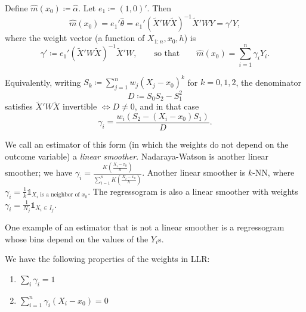 Define $\hat{m}(x_0)\coloneqq\hat{\alpha}$. Let $e_1 \coloneqq (1,0)'$. Then
\[
\hat{m}(x_0)
= e_1'\hat{\theta}
= e_1'(\tilde{X}'W\tilde{X})^{-1}\tilde{X}'WY
= \gamma' Y,
\]
where the weight vector (a function of $X_{1:n},x_0,h$) is
\[
\gamma'
\coloneqq e_1'(\tilde{X}'W\tilde{X})^{-1}\tilde{X}'W,
\qquad\text{so that}\qquad
\hat{m}(x_0)=\sum\limits_{i=1}^{n}\gamma_i Y_i.
\]

Equivalently, writing $S_k \coloneqq \sum\limits_{j=1}^{n} w_j (X_j-x_0)^k$ for $k=0,1,2$,
the denominator
\[
D \coloneqq S_0S_2 - S_1^2
\]
satisfies $\tilde{X}'W\tilde{X}$ invertible $\iff D\ne 0$, and in that case
\[
\gamma_i = \frac{w_i\left(S_2 - (X_i-x_0)S_1\right)}{D}.
\]

We call an estimator of this form (in which the weights do not depend on the outcome variable) a \emph{linear smoother}. Nadaraya-Watson is another linear smoother; we have $\gamma_i = \frac{K\left( \frac{X_i-x_0}{h} \right)}{\sum_{i=1}^{n} K\left( \frac{X_i-x_0}{h} \right)}$. Another linear smoother is $k$-NN, where $\gamma_i = \frac{1}{k} \mathds{1}_{X_i \text{ is a neighbor of $x_0$}}$. The regressogram is also a linear smoother with weights $\gamma_i = \frac{1}{N_j} \mathds{1}_{X_i \in I_j}$.

One example of an estimator that is not a linear smoother is a regressogram whose bins depend on the values of the $Y_i$s.

\begin{proposition}	We have the following properties of the weights in LLR:
	\begin{enumerate}[label=(\roman*)]
		\item $\sum_i \gamma_i = 1$
		\item $\sum_{i=1}^{n} \gamma_i \left( X_i - x_0 \right) = 0$
	\end{enumerate}
\end{proposition}


